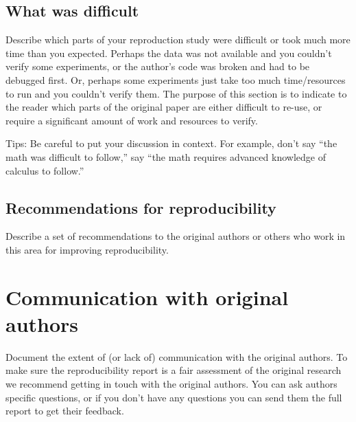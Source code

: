 \documentclass[11pt,a4paper]{article}
\begin{document}
    \subsection{What was difficult}
    Describe which parts of your reproduction study were difficult or took much more time than you expected. Perhaps the data was not available and you couldn't verify some experiments, or the author's code was broken and had to be debugged first. Or, perhaps some experiments just take too much time/resources to run and you couldn't verify them. The purpose of this section is to indicate to the reader which parts of the original paper are either difficult to re-use, or require a significant amount of work and resources to verify.

    Tips: Be careful to put your discussion in context. For example, don't say ``the math was difficult to follow,'' say ``the math requires advanced knowledge of calculus to follow.''

    \subsection{Recommendations for reproducibility}

    Describe a set of recommendations to the original authors or others who work in this area for improving reproducibility.


    \section{Communication with original authors}
    Document the extent of (or lack of) communication with the original authors. To make sure the reproducibility report is a fair assessment of the original research we recommend getting in touch with the original authors. You can ask authors specific questions, or if you don't have any questions you can send them the full report to get their feedback.


    
    

\end{document}
